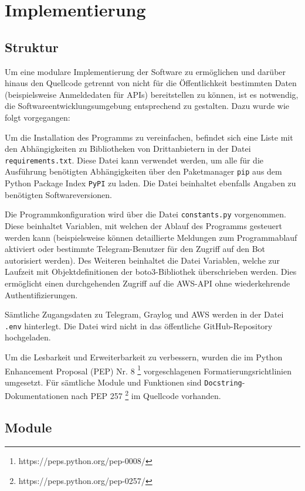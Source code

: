\chapter{Implementierung}

\section{Struktur}

Um eine modulare Implementierung der Software zu ermöglichen und darüber hinaus den Quellcode getrennt von nicht für die Öffentlichkeit bestimmten Daten (beispielsweise Anmeldedaten für APIs) bereitstellen zu können, ist es notwendig, die Softwareentwicklungsumgebung entsprechend zu gestalten. Dazu wurde wie folgt vorgegangen:

Um die Installation des Programms zu vereinfachen, befindet sich eine Liste mit den Abhängigkeiten zu Bibliotheken von Drittanbietern in der Datei \lstinline{requirements.txt}. Diese Datei kann verwendet werden, um alle für die Ausführung benötigten Abhängigkeiten über den Paketmanager \lstinline{pip} aus dem Python Package Index \lstinline{PyPI} zu laden. Die Datei beinhaltet ebenfalls Angaben zu benötigten Softwareversionen.

Die Programmkonfiguration wird über die Datei \lstinline{constants.py} vorgenommen. Diese beinhaltet Variablen, mit welchen der Ablauf des Programms gesteuert werden kann (beispielsweise können detaillierte Meldungen zum Programmablauf aktiviert oder bestimmte Telegram-Benutzer für den Zugriff auf den Bot autorisiert werden). Des Weiteren beinhaltet die Datei Variablen, welche zur Laufzeit mit Objektdefinitionen der boto3-Bibliothek überschrieben werden. Dies ermöglicht einen durchgehenden Zugriff auf die AWS-API ohne wiederkehrende Authentifizierungen.

Sämtliche Zugangsdaten zu Telegram, Graylog und AWS werden in der Datei \lstinline{.env} hinterlegt. Die Datei wird nicht in das öffentliche GitHub-Repository hochgeladen.

Um die Lesbarkeit und Erweiterbarkeit zu verbessern, wurden die im Python Enhancement Proposal (PEP) Nr. 8 \footnote{https://peps.python.org/pep-0008/} vorgeschlagenen Formatierungsrichtlinien umgesetzt. Für sämtliche Module und Funktionen sind \lstinline{Docstring}-Dokumentationen nach PEP 257 \footnote{https://peps.python.org/pep-0257/} im Quellcode vorhanden.

\section{Module}

